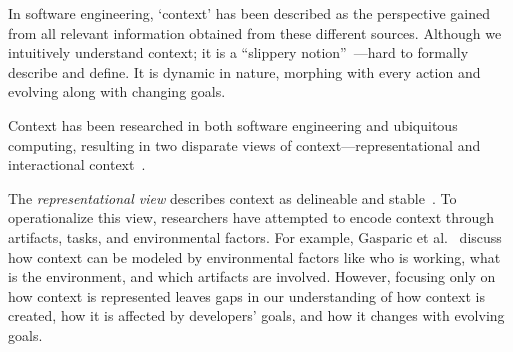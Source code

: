 
In software engineering, `context' has been described as the perspective gained from all relevant information obtained from these different sources. Although we intuitively understand context; it is a ``slippery notion''~\cite{Dourish:2004}---hard to formally describe and define. It is dynamic in nature, morphing with every action and evolving along with changing goals. 

Context has been researched in both software engineering and ubiquitous computing, resulting in two disparate views of context---representational and interactional context~\cite{Dourish:2004}.

The \textit{representational view} describes context as delineable and stable~\cite{Schilit:1994a,Abowd:1999,Pascoe:1998}. To operationalize this view, researchers have attempted to encode context through artifacts, tasks, and environmental factors. For example, Gasparic et al.~\cite{Gasparic:2017} discuss how context can be modeled by environmental factors like who is working, what is the environment, and which artifacts are involved.
However, focusing only on how context is represented leaves gaps in our understanding of how context is created, how it is affected by developers' goals, and how it changes with evolving goals. 

